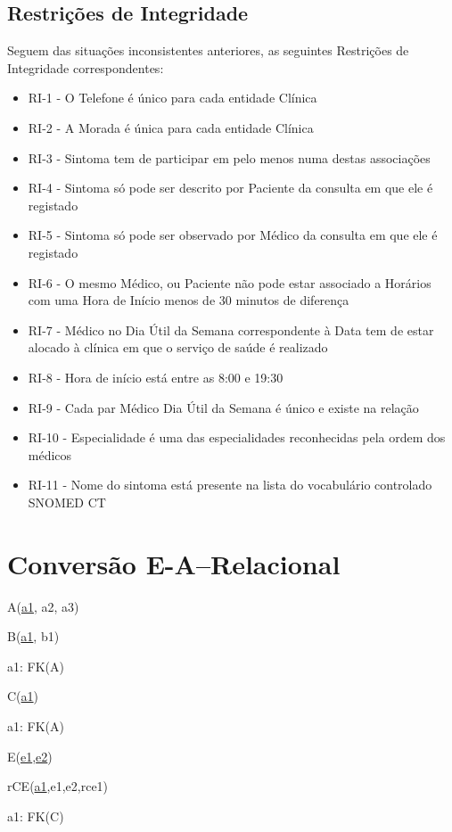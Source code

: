 \documentclass{article}
\begin{document}
\subsection{Restrições de Integridade}
Seguem das situações inconsistentes anteriores, as seguintes Restrições de Integridade correspondentes: 
\begin{itemize}
  \item RI-1 - O Telefone é único para cada entidade Clínica
  \item RI-2 - A Morada é única para cada entidade Clínica
  \item RI-3 - Sintoma tem de participar em pelo menos numa destas associações
  \item RI-4 - Sintoma só pode ser descrito por Paciente da consulta em que ele é registado
  \item RI-5 - Sintoma só pode ser observado por Médico da consulta em que ele é registado
  \item RI-6 - O mesmo Médico, ou Paciente não pode estar associado a Horários com uma Hora de Início menos de 30 minutos de diferença
  \item RI-7 - Médico no Dia Útil da Semana correspondente à Data tem de estar alocado à clínica em que o serviço de saúde é realizado
  \item RI-8 - Hora de início está entre as 8:00 e 19:30
  \item RI-9 - Cada par Médico Dia Útil da Semana é único e existe na relação
  \item RI-10 - Especialidade é uma das especialidades reconhecidas pela ordem dos médicos
  \item RI-11 - Nome do sintoma está presente na lista do vocabulário controlado SNOMED CT
\end{itemize}

\section{Conversão E-A–Relacional}

A(\underline{a1}, a2, a3)

B(\underline{a1}, b1) 

\quad a1: FK(A)

C(\underline{a1})

\quad a1: FK(A)

E(\underline{e1},\underline{e2})

rCE(\underline{a1},e1,e2,rce1)

\quad a1: FK(C)
\end{document}
